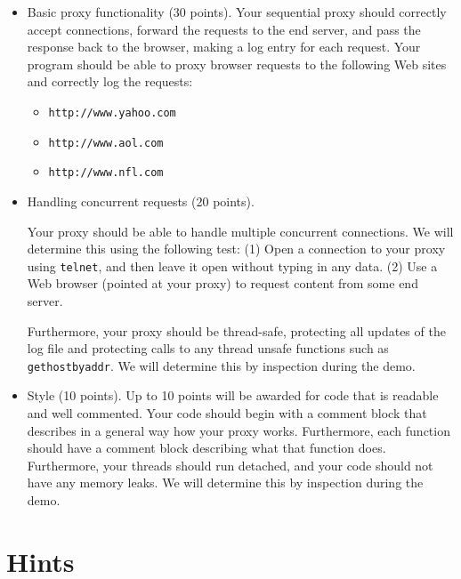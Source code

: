 \documentclass[11pt]{article}
\begin{document}
\begin{itemize}
\item Basic proxy functionality (30 points).  
Your sequential proxy should correctly accept connections, forward the
requests to the end server, and pass the response back to the browser,
making a log entry for each request. Your program should be able to
proxy browser requests to the following Web sites and correctly log 
the requests:
\begin{itemize}
\item \texttt{http://www.yahoo.com}
\item \texttt{http://www.aol.com}
\item \texttt{http://www.nfl.com}
\end{itemize}

\item Handling concurrent requests (20 points). 

Your proxy should be able to handle multiple concurrent connections.
We will determine this using the following test: (1) Open a connection
to your proxy using \texttt{telnet}, and then leave it open without
typing in any data.  (2) Use a Web browser (pointed at your proxy) to
request content from some end server.

Furthermore, your proxy should be thread-safe, protecting all updates
of the log file and protecting calls to any thread unsafe functions
such as \texttt{gethostbyaddr}.  We will determine this by inspection
during the demo.

\item Style (10 points).  
Up to 10 points will be awarded for code that is readable and well
commented. Your code should begin with a comment block that describes
in a general way how your proxy works. Furthermore, each function
should have a comment block describing what that function does.
Furthermore, your threads should run detached, and your code should
not have any memory leaks.  We will determine this by inspection
during the demo.

\end{itemize}



\section*{Hints}
\end{document}
